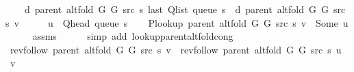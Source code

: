 \begin{isabellebody}
\ \ \ \ {\isachardoublequoteopen}d\ {\isacharparenleft}{\kern0pt}parent\ {\isacharparenleft}{\kern0pt}alt{\isacharunderscore}{\kern0pt}fold\ G{}\ G{}\ src\ s{\isacharparenright}{\kern0pt}{\isacharparenright}{\kern0pt}\ {\isacharparenleft}{\kern0pt}last\ {\isacharparenleft}{\kern0pt}Q{\isacharunderscore}{\kern0pt}list\ {\isacharparenleft}{\kern0pt}queue\ s{\isacharparenright}{\kern0pt}{\isacharparenright}{\kern0pt}{\isacharparenright}{\kern0pt}\ {\isasymle}\ d\ {\isacharparenleft}{\kern0pt}parent\ {\isacharparenleft}{\kern0pt}alt{\isacharunderscore}{\kern0pt}fold\ G{}\ G{}\ src\ s{\isacharparenright}{\kern0pt}{\isacharparenright}{\kern0pt}\ v{\isachardoublequoteclose}\isanewline
%
\isadelimproof
%
\endisadelimproof
%
\isatagproof
{}\isamarkupfalse%
\ {\isacharminus}{\kern0pt}\isanewline
\ \ \isamarkupfalse%
\ {\isacharquery}{\kern0pt}u\ {\isacharequal}{\kern0pt}\ {\isachardoublequoteopen}Q{\isacharunderscore}{\kern0pt}head\ {\isacharparenleft}{\kern0pt}queue\ s{\isacharparenright}{\kern0pt}{\isachardoublequoteclose}\isanewline
\ \ \isamarkupfalse%
\ {\isachardoublequoteopen}P{\isacharunderscore}{\kern0pt}lookup\ {\isacharparenleft}{\kern0pt}parent\ {\isacharparenleft}{\kern0pt}alt{\isacharunderscore}{\kern0pt}fold\ G{}\ G{}\ src\ s{\isacharparenright}{\kern0pt}{\isacharparenright}{\kern0pt}\ v\ {\isacharequal}{\kern0pt}\ Some\ {\isacharquery}{\kern0pt}u{\isachardoublequoteclose}\isanewline
\ \ \ \ \isamarkupfalse%
\ assms\isanewline
\ \ \ \ \isamarkupfalse%
\ {\isacharparenleft}{\kern0pt}simp\ add{\isacharcolon}{\kern0pt}\ lookup{\isacharunderscore}{\kern0pt}parent{\isacharunderscore}{\kern0pt}alt{\isacharunderscore}{\kern0pt}fold{\isacharunderscore}{\kern0pt}cong{\isacharparenright}{\kern0pt}\isanewline
\ \ \isamarkupfalse%
\ {\isachardoublequoteopen}rev{\isacharunderscore}{\kern0pt}follow\ {\isacharparenleft}{\kern0pt}parent\ {\isacharparenleft}{\kern0pt}alt{\isacharunderscore}{\kern0pt}fold\ G{}\ G{}\ src\ s{\isacharparenright}{\kern0pt}{\isacharparenright}{\kern0pt}\ v\ {\isacharequal}{\kern0pt}\ rev{\isacharunderscore}{\kern0pt}follow\ {\isacharparenleft}{\kern0pt}parent\ {\isacharparenleft}{\kern0pt}alt{\isacharunderscore}{\kern0pt}fold\ G{}\ G{}\ src\ s{\isacharparenright}{\kern0pt}{\isacharparenright}{\kern0pt}\ {\isacharquery}{\kern0pt}u\ {\isacharat}{\kern0pt}\ {\isacharbrackleft}{\kern0pt}v{\isacharbrackright}{\kern0pt}{\isachardoublequoteclose}\isanewline

\end{isabellebody}
